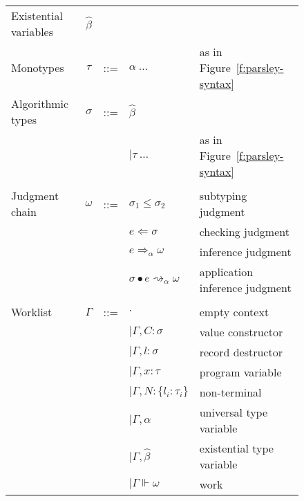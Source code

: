 \documentclass[letterpaper]{article}
\newcommand{\utv}{\alpha}             %
\newcommand{\etv}{\widehat{\beta}}    %
\begin{document}
\begin{figure}
  \begin{tabular}{l c l l l}
    Existential variables & $\etv$   &     &                                   & \\
    Monotypes             & $\tau$   & ::= & $ \utv\ \ldots $                  & as in Figure~\ref{f:parsley-syntax} \\
    Algorithmic types     & $\sigma$ & ::= & $ \etv $                          & \\
                          &          &     & $ \mid \tau\ \ldots $             & as in Figure~\ref{f:parsley-syntax} \\
                          &          &     &                                   & \\
    Judgment chain        & $\omega$ & ::= & $ \sigma_1\leq\sigma_2 $          & subtyping judgment \\
                          &          &     & $ e\Leftarrow\sigma $             & checking judgment \\
                          &          &     & $ e\Rightarrow_\utv\omega $       & inference judgment \\
                          &          &     & $ \sigma\bullet e\rightsquigarrow_\utv\omega $ & application inference judgment \\
                          &          &     &                                   & \\
    Worklist              & $\Gamma$ & ::= & $ \cdot $                         & empty context \\
                          &          &     & $ \mid\Gamma, C: \sigma$          & value constructor \\
                          &          &     & $ \mid\Gamma, l: \sigma$          & record destructor \\
                          &          &     & $ \mid\Gamma, x: \tau $           & program variable \\
                          &          &     & $ \mid\Gamma, N: \{l_i:\tau_i\} $ & non-terminal \\
                          &          &     & $ \mid\Gamma, \utv $              & universal type variable \\
                          &          &     & $ \mid\Gamma, \etv  $             & existential type variable\\
                          &          &     & $ \mid\Gamma\Vdash\omega $        & work \\


\end{tabular}
\end{figure}
\end{document}
